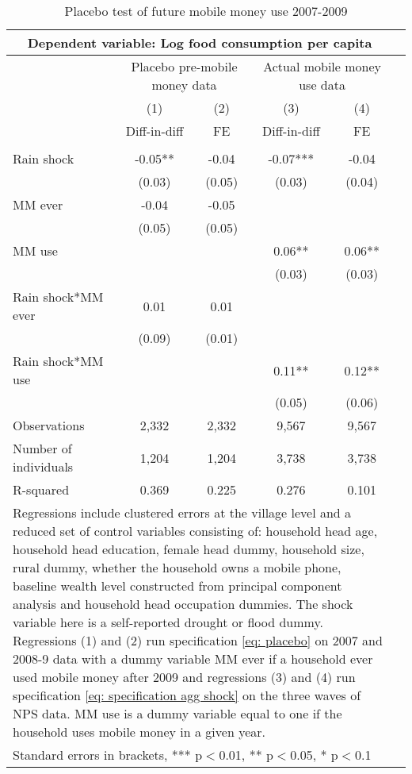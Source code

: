 \begin{table}
\centering
\caption{Placebo test of future mobile money use 2007-2009} \label{placebo}

\begin{tabular}{lccccc} \multicolumn{5}{c}{Dependent variable: Log food consumption per capita} \\\hline
& \multicolumn{2}{c}{Placebo pre-mobile money data} & \multicolumn{2}{c}{Actual mobile money use data} \\ \cmidrule(r){2-3} \cmidrule(l){4-5}
 & (1) & (2) & (3) & (4) \\
 & Diff-in-diff & FE & Diff-in-diff  & FE \\ \hline
 &  &  &  &  &  \\
Rain shock &-0.05** & -0.04 & -0.07***  & -0.04 \\
 & (0.03) & (0.05) & (0.03)  & (0.04) \\
 MM ever & -0.04 & -0.05 &    &  \\
 & (0.05) & (0.05) &  &  &  \\
MM use &  &  & 0.06** & 0.06** \\
 &  &  & (0.03) & (0.03) \\
 
Rain shock*MM ever & 0.01 & 0.01 &  &  \\
 & (0.09) & (0.01) &  &  \\

Rain shock*MM use &  &  & 0.11**  & 0.12** \\
 &  &  & (0.05) & (0.06) \\
Observations & 2,332 & 2,332 & 9,567  & 9,567 \\
Number of individuals & 1,204 & 1,204 & 3,738 & 3,738 \\
R-squared & 0.369 & 0.225 & 0.276  & 0.101 \\
  \hline
\multicolumn{5}{p{14cm}}{Regressions include clustered errors at the village level and a reduced set of control variables consisting of: household head age, household head education, female head dummy, household size, rural dummy, whether the household owns a mobile phone, baseline wealth level constructed from principal component analysis and household head occupation dummies. The shock variable here is a self-reported drought or flood dummy. Regressions (1) and (2) run specification \eqref{eq: placebo} on 2007 and 2008-9 data with a dummy variable MM ever if a household ever used mobile money after 2009 and regressions (3) and (4) run specification \eqref{eq: specification agg shock} on the three waves of NPS data. MM use is a dummy variable equal to one if the household uses mobile money in a given year.} \\
\multicolumn{5}{l}{ Standard errors in brackets, *** p$<$0.01, ** p$<$0.05, * p$<$0.1} \\
\end{tabular}
\end{table}